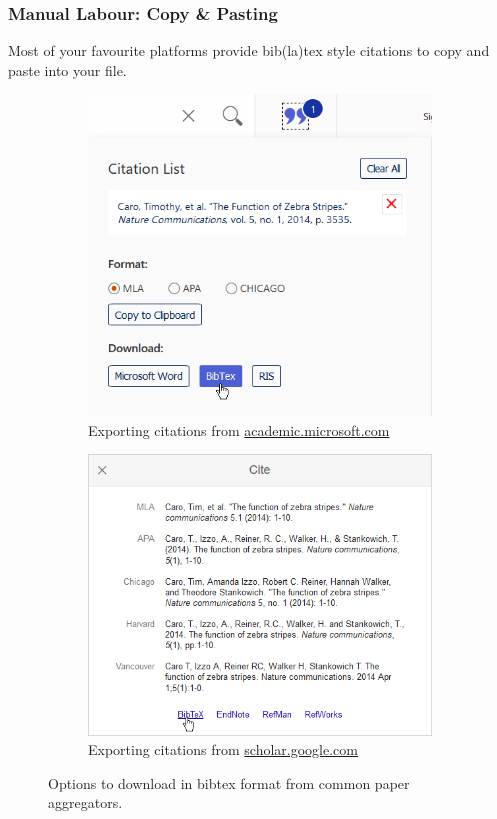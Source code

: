 \documentclass[12pt]{scrarticle}
\begin{document}
\subsubsection{Manual Labour: Copy \& Pasting}
Most of your favourite platforms provide bib(la)tex style citations to copy and paste into your file.
\begin{figure}[H]
    \centering
    \begin{subfigure}{0.49\textwidth}
        \includegraphics[width=0.9\linewidth]{Running-Example/academic_microsoft.png}
        \caption{Exporting citations from \url{academic.microsoft.com}}
    \end{subfigure}
    \begin{subfigure}{0.49\textwidth}
        \includegraphics[width=0.9\linewidth]{Running-Example/scholar_google.png}
        \caption{Exporting citations from \url{scholar.google.com}}
    \end{subfigure}
    \caption{Options to download in bibtex format from common paper aggregators.}
    \label{fig:citations}
\end{figure}
\end{document}
